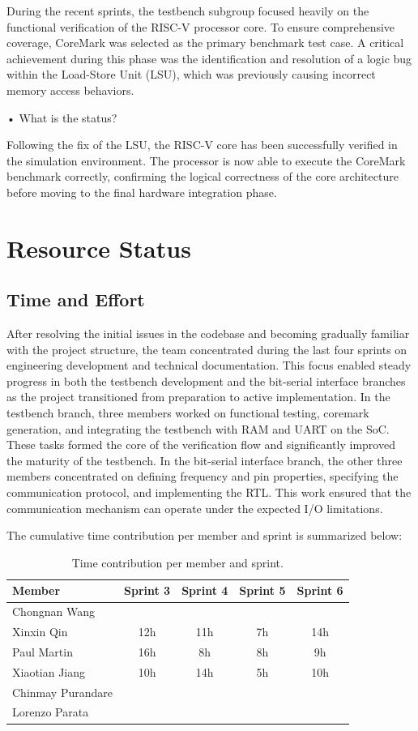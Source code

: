 \documentclass[10pt]{article}
\begin{document}
During the recent sprints, the testbench subgroup focused heavily on the functional verification of the RISC-V processor core. To ensure comprehensive coverage, CoreMark was selected as the primary benchmark test case. A critical achievement during this phase was the identification and resolution of a logic bug within the Load-Store Unit (LSU), which was previously causing incorrect memory access behaviors.

• What is the status?

Following the fix of the LSU, the RISC-V core has been successfully verified in the simulation environment. The processor is now able to execute the CoreMark benchmark correctly, confirming the logical correctness of the core architecture before moving to the final hardware integration phase.

\section{Resource Status}
\subsection{Time and Effort}
After resolving the initial issues in the codebase and becoming gradually familiar with the project structure, the team concentrated during the last four sprints on engineering development and technical documentation. This focus enabled steady progress in both the testbench development and the bit-serial interface branches as the project transitioned from preparation to active implementation.
In the testbench branch, three members worked on functional testing, coremark generation, and integrating the testbench with RAM and UART on the SoC. These tasks formed the core of the verification flow and significantly improved the maturity of the testbench.
In the bit-serial interface branch, the other three members concentrated on defining frequency and pin properties, specifying the communication protocol, and implementing the RTL. This work ensured that the communication mechanism can operate under the expected I/O limitations.

The cumulative time contribution per member and sprint is summarized below:

\begin{table}[h!]
\centering
\begin{tabular}{lcccc}
\hline
\textbf{Member} & \textbf{Sprint 3} & \textbf{Sprint 4} & \textbf{Sprint 5} & \textbf{Sprint 6} \\
\hline
Chongnan Wang & &  &  & \\
Xinxin Qin & 12h & 11h & 7h & 14h \\
Paul Martin & 16h & 8h & 8h & 9h \\
Xiaotian Jiang & 10h & 14h & 5h & 10h \\
Chinmay Purandare & &  &  & \\
Lorenzo Parata & &  &  & \\
\hline
\end{tabular}
\caption{Time contribution per member and sprint.}
\end{table}
\end{document}
